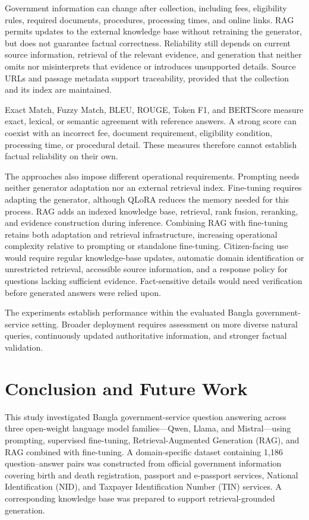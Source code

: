 \documentclass[10pt,journal,compsoc]{IEEEtran}
\begin{document}
Government information can change after collection, including fees, eligibility rules, required documents, procedures, processing times, and online links. RAG permits updates to the external knowledge base without retraining the generator, but does not guarantee factual correctness. Reliability still depends on current source information, retrieval of the relevant evidence, and generation that neither omits nor misinterprets that evidence or introduces unsupported details. Source URLs and passage metadata support traceability, provided that the collection and its index are maintained.

Exact Match, Fuzzy Match, BLEU, ROUGE, Token F1, and BERTScore measure exact, lexical, or semantic agreement with reference answers. A strong score can coexist with an incorrect fee, document requirement, eligibility condition, processing time, or procedural detail. These measures therefore cannot establish factual reliability on their own.

The approaches also impose different operational requirements. Prompting needs neither generator adaptation nor an external retrieval index. Fine-tuning requires adapting the generator, although QLoRA reduces the memory needed for this process. RAG adds an indexed knowledge base, retrieval, rank fusion, reranking, and evidence construction during inference. Combining RAG with fine-tuning retains both adaptation and retrieval infrastructure, increasing operational complexity relative to prompting or standalone fine-tuning. Citizen-facing use would require regular knowledge-base updates, automatic domain identification or unrestricted retrieval, accessible source information, and a response policy for questions lacking sufficient evidence. Fact-sensitive details would need verification before generated answers were relied upon.

The experiments establish performance within the evaluated Bangla government-service setting. Broader deployment requires assessment on more diverse natural queries, continuously updated authoritative information, and stronger factual validation.

\section{Conclusion and Future Work}
\label{sec:conclusion}
This study investigated Bangla government-service question answering
across three open-weight language model families---Qwen, Llama, and
Mistral---using prompting, supervised fine-tuning, Retrieval-Augmented
Generation (RAG), and RAG combined with fine-tuning. A domain-specific
dataset containing 1,186 question--answer pairs was constructed from
official government information covering birth and death registration,
passport and e-passport services, National Identification (NID), and
Taxpayer Identification Number (TIN) services. A corresponding knowledge
base was prepared to support retrieval-grounded generation.
\end{document}
